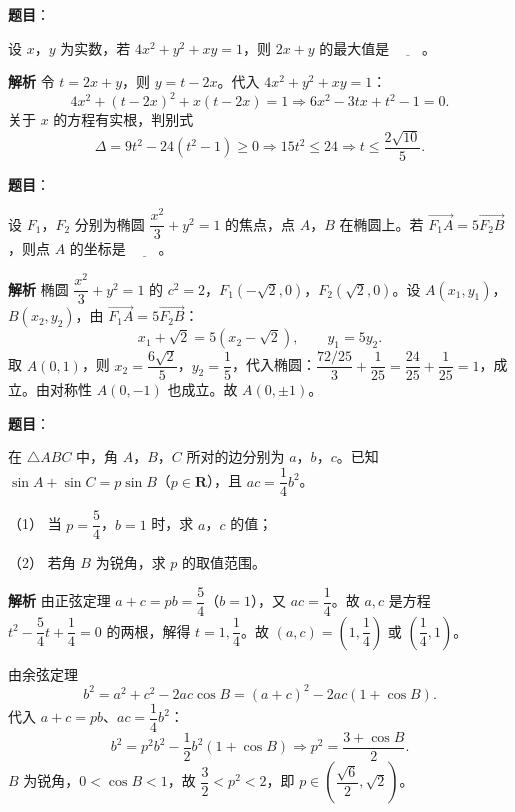 \begin{answer}

\textbf{题目}：

设 $x$，$y$ 为实数，若 $4x^2+y^2+xy=1$，则 $2x+y$ 的最大值是 $\underline{\qquad}$。

\textbf{解析}
令 $t=2x+y$，则 $y=t-2x$。代入 $4x^2+y^2+xy=1$：
\nopagebreak[4]
\[4x^2+(t-2x)^2+x(t-2x)=1\Longrightarrow6x^2-3tx+t^2-1=0.\]
关于 $x$ 的方程有实根，判别式
\nopagebreak[4]
\[\Delta=9t^2-24(t^2-1)\geqslant0\Longrightarrow15t^2\leqslant24\Longrightarrow t\leqslant\frac{2\sqrt{10}}5.\]


\end{answer}
\begin{answer}

\textbf{题目}：

设 $F_1$，$F_2$ 分别为椭圆 $\dfrac{x^2}3+y^2=1$ 的焦点，点 $A$，$B$ 在椭圆上。若 $\overrightarrow{F_1A}=5\overrightarrow{F_2B}$，则点 $A$ 的坐标是 $\underline{\qquad}$。

\textbf{解析}
椭圆 $\dfrac{x^2}3+y^2=1$ 的 $c^2=2$，$F_1(-\sqrt2,0)$，$F_2(\sqrt2,0)$。设 $A(x_1,y_1)$，$B(x_2,y_2)$，由 $\overrightarrow{F_1A}=5\overrightarrow{F_2B}$：
\nopagebreak[4]
\[x_1+\sqrt2=5(x_2-\sqrt2),\qquad y_1=5y_2.\]
取 $A(0,1)$，则 $x_2=\dfrac{6\sqrt2}5$，$y_2=\dfrac15$，代入椭圆：$\dfrac{72/25}3+\dfrac1{25}=\dfrac{24}{25}+\dfrac1{25}=1$，成立。由对称性 $A(0,-1)$ 也成立。故 $A(0,\pm1)$。


\end{answer}
\begin{answer}

\textbf{题目}：

在 $\triangle ABC$ 中，角 $A$，$B$，$C$ 所对的边分别为 $a$，$b$，$c$。已知 $\sin A+\sin C=p\sin B$（$p\in\mathbf R$），且 $ac=\dfrac14b^2$。

（1） 当 $p=\dfrac54$，$b=1$ 时，求 $a$，$c$ 的值；

（2） 若角 $B$ 为锐角，求 $p$ 的取值范围。

\textbf{解析}
由正弦定理 $a+c=pb=\dfrac54$（$b=1$），又 $ac=\dfrac14$。故 $a,c$ 是方程 $t^2-\dfrac54t+\dfrac14=0$ 的两根，解得 $t=1,\dfrac14$。故 $(a,c)=\left(1,\dfrac14\right)$ 或 $\left(\dfrac14,1\right)$。

由余弦定理
\nopagebreak[4]
\[b^2=a^2+c^2-2ac\cos B=(a+c)^2-2ac(1+\cos B).\]
代入 $a+c=pb$、$ac=\dfrac14b^2$：
\nopagebreak[4]
\[b^2=p^2b^2-\frac12b^2(1+\cos B)\Longrightarrow p^2=\frac{3+\cos B}2.\]
$B$ 为锐角，$0<\cos B<1$，故 $\dfrac32<p^2<2$，即 $p\in\left(\dfrac{\sqrt6}2,\sqrt2\right)$。



\end{answer}
